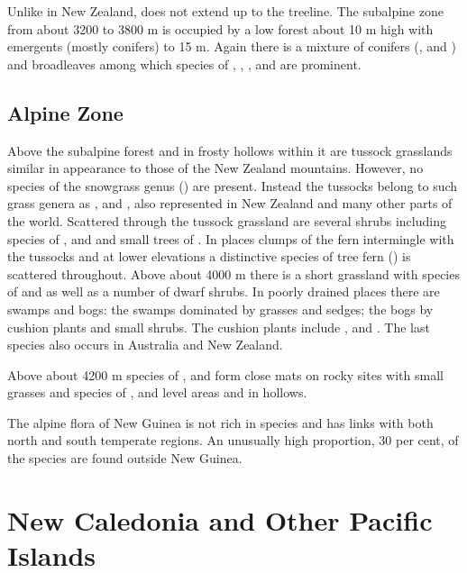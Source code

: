 Unlike in New Zealand,  does not extend up to the treeline.
The subalpine zone from about 3200 to 3800 m is occupied by a low forest about 10 m high with emergents (mostly conifers) to 15 m.
Again there is a mixture of conifers (,  and ) and broadleaves among which species of , , ,  and  are prominent.

\subsection{Alpine Zone}

Above the subalpine forest and in frosty hollows within it are tussock grasslands similar in appearance to those of the New Zealand mountains.
However, no species of the snowgrass genus () are present.
Instead the tussocks belong to such grass genera as ,  and , also represented in New Zealand and many other parts of the world.
Scattered through the tussock grassland are several shrubs including species of ,  and  and small trees of .
In places clumps of the fern  intermingle with the tussocks and at lower elevations a distinctive species of tree fern () is scattered throughout.
Above about 4000 m there is a short grassland with species of  and  as well as a number of dwarf shrubs.
In poorly drained places there are swamps and bogs: the swamps dominated by grasses and sedges; the bogs by cushion plants and small shrubs.
The cushion plants include ,  and .
The last species also occurs in Australia and New Zealand.

Above about 4200 m species of ,  and  form close mats on rocky sites with small grasses and species of ,  and  level areas and in hollows.

The alpine flora of New Guinea is not rich in species and has links with both north and south temperate regions.
An unusually high proportion, 30 per cent, of the species are found outside New Guinea.

\section{New Caledonia and Other Pacific Islands}

